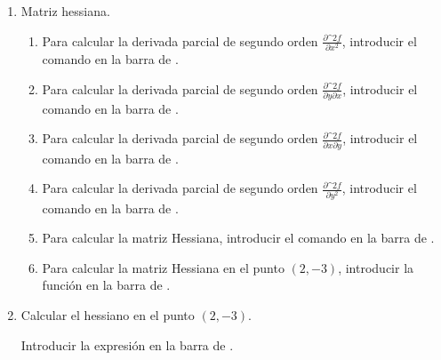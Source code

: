 \begin{enumerate}[leftmargin=*]
\begin{enumerate}
      \item Matriz hessiana.
            \begin{indication}
            \begin{enumerate}
            \item Para calcular la derivada parcial de segundo orden $\frac{\partial\^2 f}{\partial x^2}$, introducir el comando  en la barra de .
            \item Para calcular la derivada parcial de segundo orden $\frac{\partial\^2 f}{\partial y\partial x}$, introducir el comando  en la barra de .
            \item Para calcular la derivada parcial de segundo orden $\frac{\partial\^2 f}{\partial x\partial y}$, introducir el comando  en la barra de .
            \item Para calcular la derivada parcial de segundo orden $\frac{\partial\^2 f}{\partial y^2}$, introducir el comando  en la barra de .
            \item Para calcular la matriz Hessiana, introducir el comando  en la barra de .
            \item Para calcular la matriz Hessiana en el punto $(2,-3)$, introducir la función  en la barra de .
            \end{enumerate}
            \end{indication}

      \item Calcular el hessiano en el punto $(2,-3)$.
            \begin{indication}
            Introducir la expresión  en la barra de .
            \end{indication}
      \end{enumerate}



\end{enumerate}
